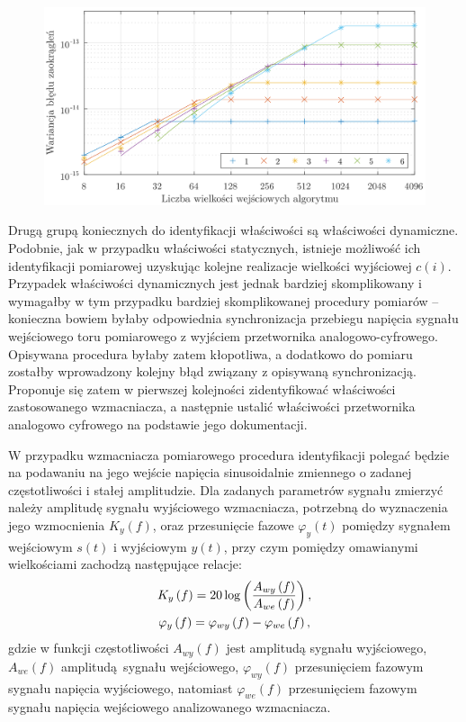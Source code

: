 \begin{figure}[htb!]
\begin{center}
\includegraphics{obrazki/dwt_rerror_coif5}
\end{center}
\end{figure}

Drugą grupą koniecznych do identyfikacji właściwości są właściwości dynamiczne. Podobnie, jak w przypadku właściwości statycznych, istnieje możliwość ich identyfikacji pomiarowej uzyskując kolejne realizacje wielkości wyjściowej $c(i)$. Przypadek właściwości dynamicznych jest jednak bardziej skomplikowany i wymagałby w tym przypadku bardziej skomplikowanej procedury pomiarów -- konieczna bowiem byłaby odpowiednia synchronizacja przebiegu napięcia sygnału wejściowego toru pomiarowego z wyjściem przetwornika analogowo-cyfrowego. Opisywana procedura byłaby zatem kłopotliwa, a dodatkowo do pomiaru zostałby wprowadzony kolejny błąd związany z opisywaną synchronizacją. Proponuje się zatem w pierwszej kolejności zidentyfikować właściwości zastosowanego wzmacniacza, a następnie ustalić właściwości przetwornika analogowo cyfrowego na podstawie jego dokumentacji.

W przypadku wzmacniacza pomiarowego procedura identyfikacji polegać będzie na podawaniu na jego wejście napięcia sinusoidalnie zmiennego o zadanej częstotliwości i stałej amplitudzie. Dla zadanych parametrów sygnału zmierzyć należy amplitudę sygnału wyjściowego wzmacniacza, potrzebną do wyznaczenia jego wzmocnienia $K_{y}(f)$, oraz przesunięcie fazowe $\varphi_{y}(t)$ pomiędzy sygnałem wejściowym $s(t)$ i wyjściowym $y(t)$, przy czym pomiędzy omawianymi wielkościami zachodzą następujące relacje:
\begin{gather}
K_{y} \left(f\right) = 20 \log \left( \frac{A_{wy} \left(f\right)}{A_{we} \left(f\right)} \right) \label{eq:pom_dyn_amp}, \\
\varphi_{y} \left(f\right) = \varphi_{wy} \left(f\right) - \varphi_{we} \left(f\right) \label{eq:pom_dyn_phi},
\end{gather}
gdzie w funkcji częstotliwości $A_{wy}(f)$ jest amplitudą sygnału wyjściowego, $A_{we}(f)$ amplitudą sygnału wejściowego, $\varphi_{wy}(f)$ przesunięciem fazowym sygnału napięcia wyjściowego, natomiast $\varphi_{we}(f)$ przesunięciem fazowym sygnału napięcia wejściowego analizowanego wzmacniacza.

